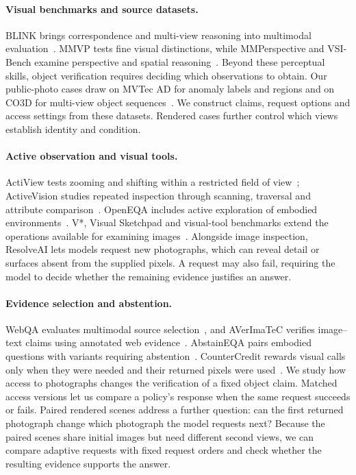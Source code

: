 \documentclass[10pt,twocolumn,letterpaper]{article}
\newcommand{\benchmark}{ResolveAI\xspace}
\begin{document}
\paragraph{Visual benchmarks and source datasets.}
BLINK brings correspondence and multi-view reasoning into multimodal evaluation~\cite{blink}.
MMVP tests fine visual distinctions, while MMPerspective and VSI-Bench examine perspective and spatial reasoning~\cite{mmvp,mmperspective,vsibench}.
Beyond these perceptual skills, object verification requires deciding which observations to obtain.
Our public-photo cases draw on MVTec AD for anomaly labels and regions and on CO3D for multi-view object sequences~\cite{mvtec,co3d}.
We construct claims, request options and access settings from these datasets.
Rendered cases further control which views establish identity and condition.

\paragraph{Active observation and visual tools.}
ActiView tests zooming and shifting within a restricted field of view~\cite{actiview}; ActiveVision studies repeated inspection through scanning, traversal and attribute comparison~\cite{activevision}.
OpenEQA includes active exploration of embodied environments~\cite{openeqa}.
V*, Visual Sketchpad and visual-tool benchmarks extend the operations available for examining images~\cite{vstar,sketchpad,visualtoolbench,vtcbench}.
Alongside image inspection, \benchmark lets models request new photographs, which can reveal detail or surfaces absent from the supplied pixels.
A request may also fail, requiring the model to decide whether the remaining evidence justifies an answer.

\paragraph{Evidence selection and abstention.}
WebQA evaluates multimodal source selection~\cite{webqa}, and AVerImaTeC verifies image--text claims using annotated web evidence~\cite{averimatec}.
AbstainEQA pairs embodied questions with variants requiring abstention~\cite{abstaineqa}.
CounterCredit rewards visual calls only when they were needed and their returned pixels were used~\cite{countercredit}.
We study how access to photographs changes the verification of a fixed object claim.
Matched access versions let us compare a policy's response when the same request succeeds or fails.
Paired rendered scenes address a further question: can the first returned photograph change which photograph the model requests next?
Because the paired scenes share initial images but need different second views, we can compare adaptive requests with fixed request orders and check whether the resulting evidence supports the answer.
\end{document}
